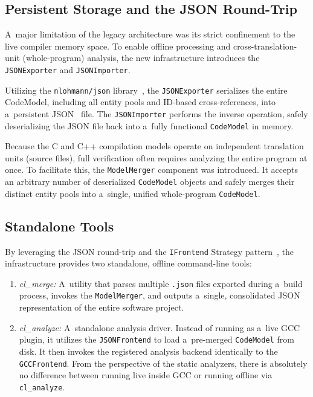 \documentclass[xpsejal00-gcc-plugin.tex]{subfiles}
\begin{document}
\subsection*{Persistent Storage and the JSON Round-Trip}\label{sub:json-round-trip}

A~major limitation of the legacy architecture was its strict confinement to the live compiler memory space.
To enable offline processing and cross-translation-unit (whole-program) analysis, the new infrastructure introduces the \texttt{JSONExporter} and \texttt{JSONImporter}.

Utilizing the \texttt{nlohmann/json} library~\cite{nlohmannJson}, the \texttt{JSONExporter} serializes the entire CodeModel, including all entity pools and ID-based cross-references, into a~persistent JSON~\cite{JSON} file.
The \texttt{JSONImporter} performs the inverse operation, safely deserializing the JSON file back into a~fully functional \texttt{CodeModel} in memory.

Because the C and C++ compilation models operate on independent translation units (source files), full verification often requires analyzing the entire program at once.
To facilitate this, the \texttt{ModelMerger} component was introduced.
It accepts an arbitrary number of deserialized \texttt{CodeModel} objects and safely merges their distinct entity pools into a~single, unified whole-program \texttt{CodeModel}.

\subsection*{Standalone Tools}\label{sub:standalone-tools}

By leveraging the JSON round-trip and the \texttt{IFrontend} Strategy pattern~\cite{GoF}, the infrastructure provides two standalone, offline command-line tools:

\begin{enumerate}
  \item \textit{cl\_merge:} A~utility that parses multiple \texttt{.json} files exported during a~build process, invokes the \texttt{ModelMerger}, and outputs a~single, consolidated JSON representation of the entire software project.
  \item \textit{cl\_analyze:} A~standalone analysis driver.
    Instead of running as a~live GCC plugin, it utilizes the \texttt{JSONFrontend} to load a~pre-merged \texttt{CodeModel} from disk.
    It then invokes the registered analysis backend identically to the \texttt{GCCFrontend}.
    From the perspective of the static analyzers, there is absolutely no difference between running live inside GCC or running offline via \texttt{cl\_analyze}.
\end{enumerate}
\end{document}
